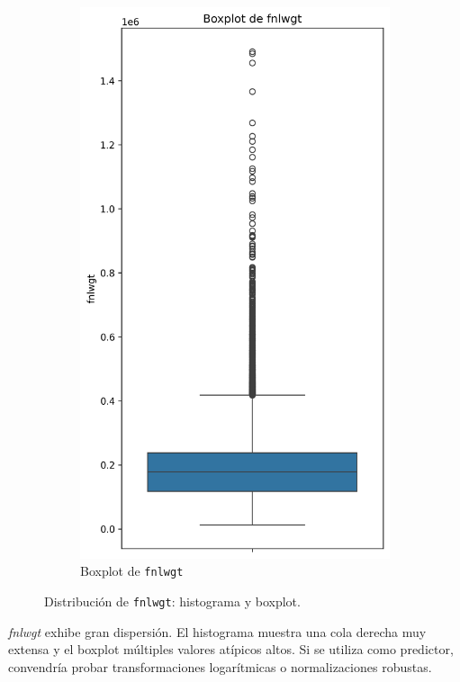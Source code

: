 \documentclass[12pt,a4paper]{article}
\begin{document}
\begin{enumerate}
\begin{figure}[H]
\begin{subfigure}[b]{0.45\textwidth}
        \includegraphics[width=\textwidth]{boxplot_fnlwgt.png}
        \caption{Boxplot de \texttt{fnlwgt}}
        \label{fig:fnlwgt_boxplot}
      \end{subfigure}
      \caption{Distribución de \texttt{fnlwgt}: histograma y boxplot.}
      \label{fig:fnlwgt_visual}
    \end{figure}

    \emph{fnlwgt} exhibe gran dispersión. El histograma muestra una cola derecha muy extensa y el boxplot múltiples valores atípicos altos. 
    Si se utiliza como predictor, convendría probar transformaciones logarítmicas o normalizaciones robustas.


\end{enumerate}
\end{document}
